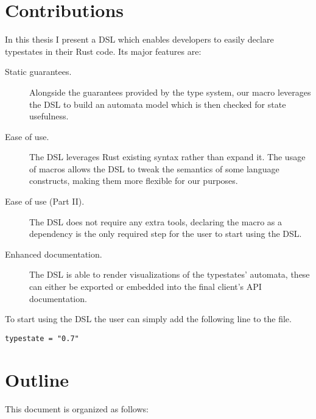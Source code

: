 \section{Contributions}\label{sec:objectives}

In this thesis I present a \gls{DSL} which enables developers to easily declare typestates in their Rust code.
Its major features are:

\begin{description}
    \item[Static guarantees.] Alongside the guarantees provided by the type system,
    our macro leverages the \gls{DSL} to build an automata model which is then checked for state usefulness.
    \item[Ease of use.] The \gls{DSL} leverages Rust existing syntax rather than expand it.
    The usage of macros allows the \gls{DSL} to tweak the semantics of some language constructs,
    making them more flexible for our purposes.
    \item[Ease of use (Part II).] The \gls{DSL} does not require any extra tools,
    declaring the macro as a dependency is the only required step for the user to start using the \gls{DSL}.
    \item[Enhanced documentation.] The \gls{DSL} is able to render visualizations of the typestates' automata,
    these can either be exported or embedded into the final client's \gls{API} documentation.
\end{description}
To start using the DSL the user can simply add the following line to the  file.
\begin{verbatim}
typestate = "0.7"
\end{verbatim}

\section{Outline}\label{sec:organization}

This document is organized as follows:

